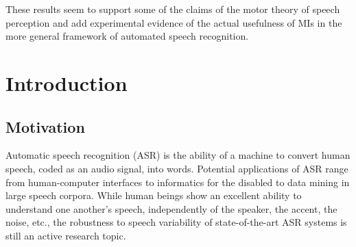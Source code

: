 \documentclass[10pt]{article}
\begin{document}
  These results seem to support some of the claims of the motor theory of speech perception
  and add experimental evidence of the actual usefulness of MIs in the more general
  framework of automated speech recognition.




\section*{Introduction}
\subsection*{Motivation}
Automatic speech recognition (ASR) is the ability of a machine
to convert human speech, coded as an audio signal, into words.
Potential applications of ASR range from human-computer interfaces
to informatics for the disabled to data mining in large speech corpora.
While human beings show an excellent ability to understand one another's speech,
independently of the speaker, the accent, the noise, etc., the robustness to
speech variability of state-of-the-art ASR systems is still an active research
topic.
\end{document}

